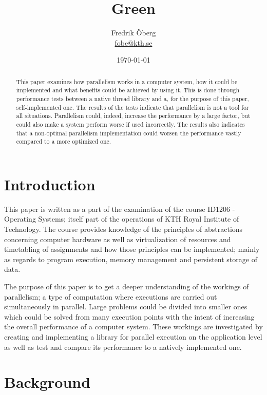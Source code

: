 \documentclass{article}
\begin{document}
\title{Green}
\author{Fredrik Öberg \\ \href{mailto:fobe@kth.se}{fobe@kth.se}}
\date{\today}
\maketitle

\begin{abstract}
This paper examines how parallelism works in a computer system, how it could be implemented and what benefits could be achieved by using it. This is done through performance tests between a native thread library and a, for the purpose of this paper, self-implemented one. The results of the tests indicate that parallelism is not a tool for all situations. Parallelism could, indeed, increase the performance by a large factor, but could also make a system perform worse if used incorrectly. The results also indicates that a non-optimal parallelism implementation could worsen the performance vastly compared to a more optimized one.
\end{abstract}

\newpage
\tableofcontents
\newpage

\section{Introduction}
This paper is written as a part of the examination of the course ID1206 - Operating Systems; itself part of the operations of KTH Royal Institute of Technology. The course provides knowledge of the principles of abstractions concerning computer hardware as well as virtualization of resources and timetabling of assignments and how those principles can be implemented; mainly as regards to program execution, memory management and persistent storage of data. 

The purpose of this paper is to get a deeper understanding of the workings of parallelism; a type of computation where executions are carried out simultaneously in parallel. Large problems could be divided into smaller ones which could be solved from many execution points with the intent of increasing the overall performance of a computer system. These workings are investigated by creating and implementing a library for parallel execution on the application level as well as test and compare its performance to a natively implemented one. 

\section{Background}\label{background}
\end{document}

